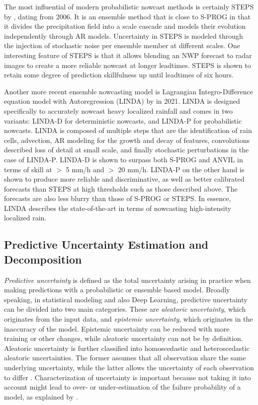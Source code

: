 The most influential of modern probabilistic nowcast methods is certainly STEPS by \citet{bowler_steps_2006}, dating from 2006. It is an ensemble method that is close to S-PROG in that it divides the precipitation field into a scale cascade and models their evolution independently through AR models. Uncertainty in STEPS is modeled through the injection of stochastic noise per ensemble member at different scales. One interesting feature of STEPS is that it allows blending an NWP forecast to radar images to create a more reliable nowcast at longer leadtimes. STEPS is shown to retain some degree of prediction skillfulness up until leadtimes of six hours. \cite{bowler_steps_2006}

Another more recent ensemble nowcasting model is Lagrangian Integro-Difference equation model with Autoregression (LINDA) by \citet{pulkkinen_lagrangian_2021} in 2021. LINDA is designed specifically to accurately nowcast heavy localized rainfall and comes in two variants: LINDA-D for deterministic nowcasts, and LINDA-P for probabilistic nowcasts. LINDA is composed of multiple steps that are the identification of rain cells, advection, AR modeling for the growth and decay of features, convolutions described loss of detail at small scale, and finally stochastic perturbations in the case of LINDA-P. LINDA-D is shown to surpass both S-PROG and ANVIL in terms of skill at  $>$ 5 mm/h and $>$ 20 mm/h. LINDA-P on the other hand is shown to produce more reliable and discriminative, as well as better calibrated forecasts than STEPS at high thresholds such as those described above. The forecasts are also less blurry than those of S-PROG or STEPS. In essence, LINDA describes the state-of-the-art in terms of nowcasting high-intensity localized rain. 


\subsection{Predictive Uncertainty Estimation and Decomposition}

\textit{Predictive uncertainty} is defined as the total uncertainty arising in practice when making predictions with a probabilistic or ensemble based model.
Broadly speaking, in statistical modeling and also Deep Learning, predictive uncertainty can be divided into two main categories. These are \textit{aleatoric uncertainty}, which originates from the input data, and \textit{epistemic uncertainty}, which originates in the inaccuracy of the model. Epistemic uncertainty can be reduced with more training or other changes, while aleatoric uncertainty can not be by definition. Aleatoric uncertainty is further classified into homoscedastic and heteroscedastic aleatoric uncertainties. The former assumes that all observation share the same underlying uncertainty, while the latter allows the uncertainty of each observation to differ \cite{shridhar_comprehensive_2019}. Characterization of uncertainty is important because not taking it into account might lead to over- or under-estimation of the failure probability of a model, as explained by \citet{kiureghian_aleatory_2009}. 


